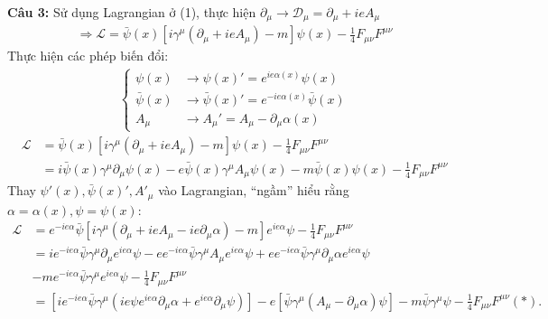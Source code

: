 \documentclass{article}
\begin{document}
\textbf{Câu 3:} Sử dụng Lagrangian ở (1), thực hiện $\partial_\mu \rightarrow \mathcal{D}_\mu=\partial_\mu+ieA_\mu $
\begin{align*}
	\Rightarrow \mathcal{L} =\bar{\psi}(x)\left[i\gamma^\mu(\partial_\mu+ieA_\mu)-m\right]\psi(x)-\frac{1}{4}F_{\mu\nu}F^{\mu\nu}
\end{align*}
Thực hiện các phép biến đổi:
\begin{align}
	\begin{cases}
		\psi(x)       & \rightarrow\psi(x)'=e^{ie\alpha(x)}\psi(x)              \\
		\bar{\psi}(x) & \rightarrow\bar{\psi}(x)'=e^{-ie\alpha(x)}\bar{\psi}(x) \\
		A_\mu         & \rightarrow A_\mu'=A_\mu-\partial_\mu\alpha(x)
	\end{cases}
\end{align}
\begin{align*}
	\mathcal{L} & = \bar{\psi}(x)\left[i\gamma^\mu(\partial_\mu+ieA_\mu)-m\right]\psi(x)-\frac{1}{4}F_{\mu\nu}F^{\mu\nu}                                    \\
	            & = i\bar{\psi}(x)\gamma^\mu\partial_\mu\psi(x)-e\bar{\psi}(x)\gamma^\mu A_\mu\psi(x)-m\bar{\psi}(x)\psi(x)-\frac{1}{4}F_{\mu\nu}F^{\mu\nu}
\end{align*}
Thay $\psi'(x), \bar{\psi}(x)',A'_\mu$  vào Lagrangian, ``ngầm'' hiểu rằng $\alpha = \alpha(x), \psi = \psi(x	)$:
\begin{align*}
	\mathcal{L} & = e^{-ie\alpha}\bar{\psi}\left[i\gamma^\mu\left(\partial_\mu + ie A_\mu - ie \partial_\mu\alpha\right)-m\right] e^{ie\alpha}\psi -\frac{1}{4}F_{\mu\nu}F^{\mu\nu}                                                                                                                     \\
	            & = i e^{-ie\alpha}\bar{\psi} \gamma^\mu \partial_\mu e^{ie\alpha} \psi  - e e^{-ie\alpha}\bar{\psi} \gamma^\mu A_\mu e^{ie\alpha} \psi + e e^{-ie\alpha}\bar{\psi} \gamma^\mu \partial_\mu \alpha e^{ie\alpha} \psi                                                                    \\
	            & - m e^{-ie\alpha}\bar{\psi} \gamma^\mu e^{ie\alpha} \psi -\frac{1}{4}F_{\mu\nu}F^{\mu\nu}                                                                                                                                                                                             \\
	            & = \left[ie^{-ie\alpha}\bar{\psi}\gamma^\mu(ie \psi  e^{ie\alpha} \partial_\mu\alpha + e^{ie\alpha}\partial_\mu\psi)\right] - e\left[ \bar{\psi} \gamma^\mu \left(A_\mu - \partial_\mu \alpha \right)\psi \right] - m \bar{\psi} \gamma^\mu \psi -\frac{1}{4}F_{\mu\nu}F^{\mu\nu} (*).
\end{align*}
\end{document}
